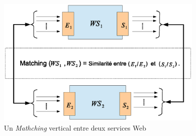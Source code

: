 
\begin{figure}[h]
    \centering
    \includegraphics[width=0.9\textwidth]{figs/matching-general.eps}
    \caption{Un \textit{Mathching} vertical entre deux services Web}
    \label{fig:matching-general}
\end{figure}

